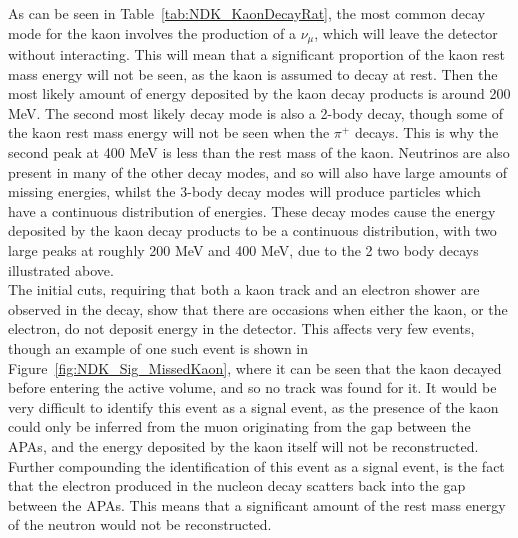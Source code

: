 As can be seen in Table~\ref{tab:NDK_KaonDecayRat}, the most common decay mode for the kaon involves the production of a $\nu_{\mu}$, which will leave the detector without interacting. This will mean that a significant proportion of the kaon rest mass energy will not be seen, as the kaon is assumed to decay at rest. Then the most likely amount of energy deposited by the kaon decay products is around 200 MeV. The second most likely decay mode is also a 2-body decay, though some of the kaon rest mass energy will not be seen when the $\pi^{+}$ decays. This is why the second peak at 400 MeV is less than the rest mass of the kaon. Neutrinos are also present in many of the other decay modes, and so will also have large amounts of missing energies, whilst the 3-body decay modes will produce particles which have a continuous distribution of energies. These decay modes cause the energy deposited by the kaon decay products to be a continuous distribution, with two large peaks at roughly 200 MeV and 400 MeV, due to the 2 two body decays illustrated above. \\

The initial cuts, requiring that both a kaon track and an electron shower are observed in the decay, show that there are occasions when either the kaon, or the electron, do not deposit energy in the detector. This affects very few events, though an example of one such event is shown in Figure~\ref{fig:NDK_Sig_MissedKaon}, where it can be seen that the kaon decayed before entering the active volume, and so no track was found for it. It would be very difficult to identify this event as a signal event, as the presence of the kaon could only be inferred from the muon originating from the gap between the APAs, and the energy deposited by the kaon itself will not be reconstructed. Further compounding the identification of this event as a signal event, is the fact that the electron produced in the nucleon decay scatters back into the gap between the APAs. This means that a significant amount of the rest mass energy of the neutron would not be reconstructed. \\

